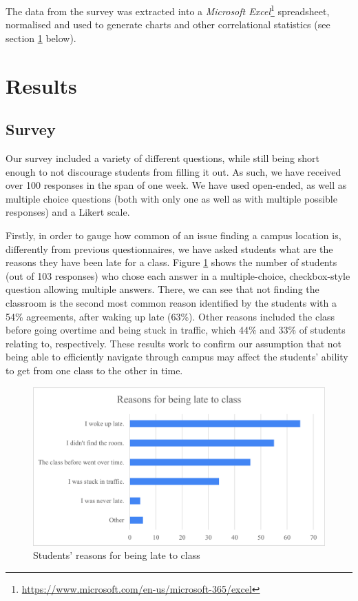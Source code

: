     The data from the survey was extracted into a \textit{Microsoft Excel}\footnote{\url{https://www.microsoft.com/en-us/microsoft-365/excel}} spreadsheet, normalised and used to generate charts and other correlational statistics (see section \ref{4:results} below).


\section{Results} \label{4:results}

    \subsection{Survey}

        Our survey included a variety of different questions, while still being short enough to not discourage students from filling it out. As such, we have received over 100 responses in the span of one week. We have used open-ended, as well as multiple choice questions (both with only one as well as with multiple possible responses) and a Likert scale.
        
        Firstly, in order to gauge how common of an issue finding a campus location is, differently from previous questionnaires, we have asked students what are the reasons they have been late for a class. Figure \ref{4:fig:late_to_class} shows the number of students (out of 103 responses) who chose each answer in a multiple-choice, checkbox-style question allowing multiple answers. There, we can see that not finding the classroom is the second most common reason identified by the students with a 54\% agreements, after waking up late (63\%). Other reasons included the class before going overtime and being stuck in traffic, which 44\% and 33\% of students relating to, respectively.
        These results work to confirm our assumption that not being able to efficiently navigate through campus may affect the students' ability to get from one class to the other in time.
            
        \begin{figure}[!ht]
            \centering
            \includegraphics[width=\textwidth]{figures/charts/late_to_class.png}
            \caption{Students' reasons for being late to class}
            \label{4:fig:late_to_class}
        \end{figure}
        
